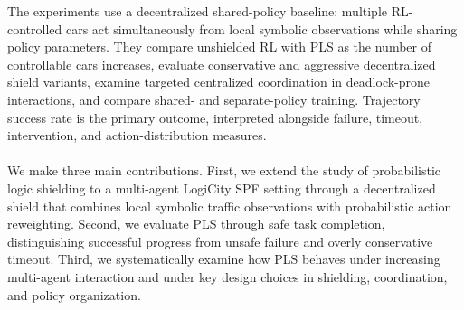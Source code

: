 \noindent The experiments use a decentralized shared-policy baseline: multiple RL-controlled cars act simultaneously from local symbolic observations while sharing policy parameters. They compare unshielded RL with PLS as the number of controllable cars increases, evaluate conservative and aggressive decentralized shield variants, examine targeted centralized coordination in deadlock-prone interactions, and compare shared- and separate-policy training. Trajectory success rate is the primary outcome, interpreted alongside failure, timeout, intervention, and action-distribution measures.
\\
\\
We make three main contributions. First, we extend the study of probabilistic logic shielding to a multi-agent LogiCity SPF setting through a decentralized shield that combines local symbolic traffic observations with probabilistic action reweighting. Second, we evaluate PLS through safe task completion, distinguishing successful progress from unsafe failure and overly conservative timeout. Third, we systematically examine how PLS behaves under increasing multi-agent interaction and under key design choices in shielding, coordination, and policy organization.

